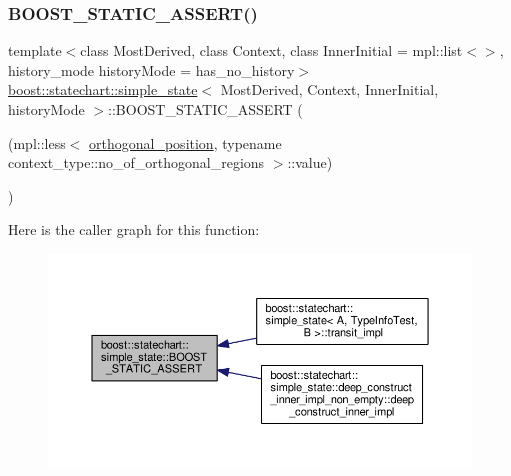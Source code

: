 \subsubsection{\texorpdfstring{B\+O\+O\+S\+T\+\_\+\+S\+T\+A\+T\+I\+C\+\_\+\+A\+S\+S\+E\+R\+T()}{BOOST\_STATIC\_ASSERT()}\hspace{0.1cm}{\footnotesize\ttfamily [1/2]}}
{\footnotesize\ttfamily template$<$class Most\+Derived, class Context, class Inner\+Initial = mpl\+::list$<$$>$, history\+\_\+mode history\+Mode = has\+\_\+no\+\_\+history$>$ \\
\mbox{\hyperlink{classboost_1_1statechart_1_1simple__state}{boost\+::statechart\+::simple\+\_\+state}}$<$ Most\+Derived, Context, Inner\+Initial, history\+Mode $>$\+::B\+O\+O\+S\+T\+\_\+\+S\+T\+A\+T\+I\+C\+\_\+\+A\+S\+S\+E\+RT (\begin{DoxyParamCaption}\item[{(mpl\+::less$<$ \mbox{\hyperlink{classboost_1_1statechart_1_1simple__state_af97b00e4ff6f12a1045beb57687cf9bc}{orthogonal\+\_\+position}}, typename context\+\_\+type\+::no\+\_\+of\+\_\+orthogonal\+\_\+regions $>$\+::value)}]{ }\end{DoxyParamCaption})}

Here is the caller graph for this function\+:
\nopagebreak
\begin{figure}[H]
\begin{center}
\leavevmode
\includegraphics[width=350pt]{classboost_1_1statechart_1_1simple__state_a19a11b763b74902e6895452ee41384d7_icgraph}
\end{center}
\end{figure}
\mbox{\label{classboost_1_1statechart_1_1simple__state_a0218fcd7d5fa8cf04dd00f9f72bd6a4e}} 
